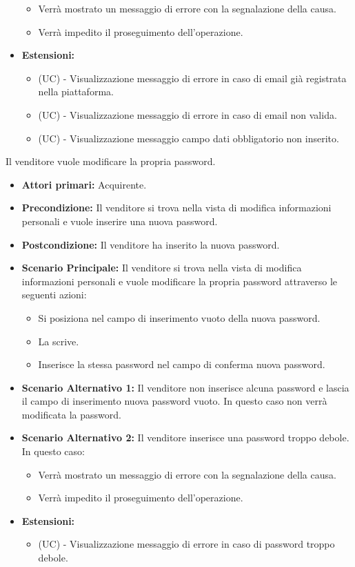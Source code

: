 \begin{itemize}
\begin{itemize}
        \item Verrà mostrato un messaggio di errore con la segnalazione della causa.
        \item Verrà impedito il proseguimento dell'operazione.
    \end{itemize}
    \item \textbf{Estensioni:}
    \begin{itemize}
        \item (UC) - Visualizzazione messaggio di errore in caso di email già registrata nella piattaforma.
        \item (UC) - Visualizzazione messaggio di errore in caso di email non valida.
        \item (UC) - Visualizzazione messaggio campo dati obbligatorio non inserito.
    \end{itemize}
\end{itemize}

Il venditore vuole modificare la propria password.
\begin{itemize}
    \item \textbf{Attori primari:} Acquirente.
    \item \textbf{Precondizione:} Il venditore si trova nella vista di modifica informazioni personali e vuole inserire una nuova password.
    \item \textbf{Postcondizione:} Il venditore ha inserito la nuova password.
    \item \textbf{Scenario Principale:} Il venditore si trova nella vista di modifica informazioni personali e vuole modificare la propria password attraverso le seguenti azioni:
        \begin{itemize}
            \item Si posiziona nel campo di inserimento vuoto della nuova password.
            \item La scrive.
            \item Inserisce la stessa password nel campo di conferma nuova password.
        \end{itemize}
    \item \textbf{Scenario Alternativo 1:} Il venditore non inserisce alcuna password e lascia il campo di inserimento nuova password vuoto. In questo caso non verrà modificata la password.
    \item \textbf{Scenario Alternativo 2:} Il venditore inserisce una password troppo debole. In questo caso:
    \begin{itemize}
        \item Verrà mostrato un messaggio di errore con la segnalazione della causa.
        \item Verrà impedito il proseguimento dell'operazione.
    \end{itemize}
    \item \textbf{Estensioni:}
    \begin{itemize}
        \item (UC) - Visualizzazione messaggio di errore in caso di password troppo debole.
    \end{itemize}
\end{itemize}

